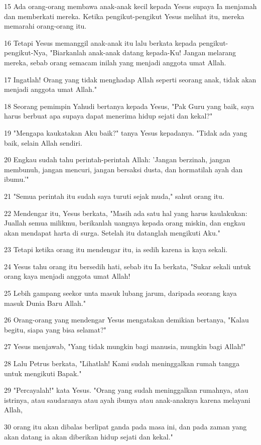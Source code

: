 \par 15 Ada orang-orang membawa anak-anak kecil kepada Yesus supaya Ia menjamah dan memberkati mereka. Ketika pengikut-pengikut Yesus melihat itu, mereka memarahi orang-orang itu.
\par 16 Tetapi Yesus memanggil anak-anak itu lalu berkata kepada pengikut-pengikut-Nya, "Biarkanlah anak-anak datang kepada-Ku! Jangan melarang mereka, sebab orang semacam inilah yang menjadi anggota umat Allah.
\par 17 Ingatlah! Orang yang tidak menghadap Allah seperti seorang anak, tidak akan menjadi anggota umat Allah."
\par 18 Seorang pemimpin Yahudi bertanya kepada Yesus, "Pak Guru yang baik, saya harus berbuat apa supaya dapat menerima hidup sejati dan kekal?"
\par 19 "Mengapa kaukatakan Aku baik?" tanya Yesus kepadanya. "Tidak ada yang baik, selain Allah sendiri.
\par 20 Engkau sudah tahu perintah-perintah Allah: 'Jangan berzinah, jangan membunuh, jangan mencuri, jangan bersaksi dusta, dan hormatilah ayah dan ibumu.'"
\par 21 "Semua perintah itu sudah saya turuti sejak muda," sahut orang itu.
\par 22 Mendengar itu, Yesus berkata, "Masih ada satu hal yang harus kaulakukan: Juallah semua milikmu, berikanlah uangnya kepada orang miskin, dan engkau akan mendapat harta di surga. Setelah itu datanglah mengikuti Aku."
\par 23 Tetapi ketika orang itu mendengar itu, ia sedih karena ia kaya sekali.
\par 24 Yesus tahu orang itu bersedih hati, sebab itu Ia berkata, "Sukar sekali untuk orang kaya menjadi anggota umat Allah!
\par 25 Lebih gampang seekor unta masuk lubang jarum, daripada seorang kaya masuk Dunia Baru Allah."
\par 26 Orang-orang yang mendengar Yesus mengatakan demikian bertanya, "Kalau begitu, siapa yang bisa selamat?"
\par 27 Yesus menjawab, "Yang tidak mungkin bagi manusia, mungkin bagi Allah!"
\par 28 Lalu Petrus berkata, "Lihatlah! Kami sudah meninggalkan rumah tangga untuk mengikuti Bapak."
\par 29 "Percayalah!" kata Yesus. "Orang yang sudah meninggalkan rumahnya, atau istrinya, atau saudaranya atau ayah ibunya atau anak-anaknya karena melayani Allah,
\par 30 orang itu akan dibalas berlipat ganda pada masa ini, dan pada zaman yang akan datang ia akan diberikan hidup sejati dan kekal."
